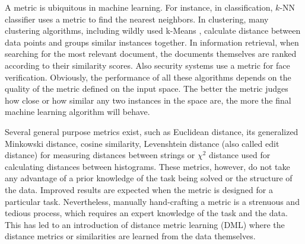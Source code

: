 A metric is ubiquitous in machine learning. For instance, in classification, $k$-NN classifier \cite{cover1967nearest} uses a metric to find the nearest neighbors. In clustering, many clustering algorithms, including wildly used k-Means \cite{hartigan1979algorithm}, calculate distance between data points and groups similar instances together. In information retrieval, when searching for the most relevant document, the documents themselves are ranked according to their similarity scores. Also security systems use a metric for face verification. Obviously, the performance of all these algorithms depends on the quality of the metric defined on the input space. The better the metric judges how close or how similar any two instances in the space are, the more the final machine learning algorithm will behave.

Several general purpose metrics exist, such as Euclidean distance, its generalized Minkowski distance, cosine similarity, Levenshtein distance (also called edit distance) for measuring distances between strings or $\chi^2$ distance used for calculating distances between histograms. These metrics, however, do not take any advantage of a prior knowledge of the task being solved or the structure of the data. Improved results are expected when the metric is designed for a particular task. Nevertheless, manually hand-crafting a metric is a strenuous and tedious process, which requires an expert knowledge of the task and the data. This has led to an introduction of distance metric learning (DML) where the distance metrics or similarities are learned from the data themselves.

